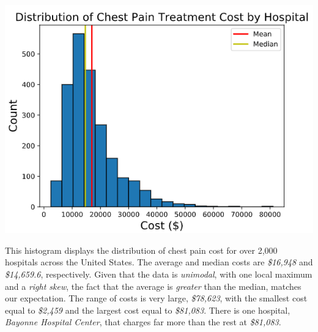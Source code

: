 \documentclass[11pt, a4paper]{article}
\begin{document}
\begin{spacing}{1.1}
	\begin{minipage}[c]{8cm}
		\includegraphics[scale=.5]{chest}
	\end{minipage}
	\begin{minipage}[c]{9.5cm}
		This histogram displays the distribution of chest pain cost for over 2,000 hospitals across the United States. The average and median costs are \textit{\$16,948} and \textit{\$14,659.6}, respectively. Given that the data is \textit{unimodal}, with one local maximum and a \textit{right skew}, the fact that the average is \textit{greater} than the median, matches our expectation. The range of costs is very large, \textit{\$78,623}, with the smallest cost equal to \textit{\$2,459} and the largest cost equal to \textit{\$81,083}. There is one hospital, \textit{Bayonne Hospital Center}, that charges far more than the rest at \textit{\$81,083}.
	\end{minipage} \vspace*{4mm}
	

\end{spacing}
\end{document}

